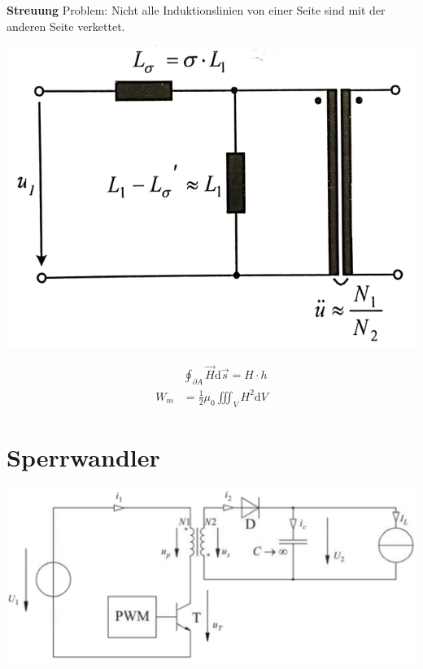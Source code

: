 \documentclass[10pt,landscape]{scrartcl}
\begin{document}
\begin{multicols}{2}
\textbf{Streuung}
Problem: Nicht alle Induktionslinien von einer Seite sind mit der anderen Seite verkettet. 

\begin{minipage}[h]{0.6\linewidth}
  \includegraphics[width=\linewidth]{img/trafo/trafo_tech_esb.png}%
\end{minipage}
\begin{minipage}[h]{0.3\linewidth}\begin{align*}
      &\oint_{\partial A}\vec{H}\mathrm{d}\vec{s} = H\cdot h \\
      W_m &= \frac{1}{2}\mu_0 \iiint_V H^2\mathrm{d}V
    \end{align*}
\end{minipage}
\vfill\null
\columnbreak
\section{Sperrwandler}

\begin{center}
\includegraphics[width=0.8\linewidth]{img/sch_sperr.png}%
\end{center}


\end{multicols}
\end{document}
